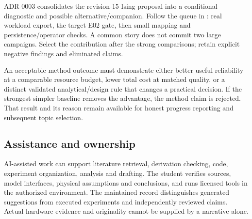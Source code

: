 ADR-0003 consolidates the revision-15 Ising proposal into a conditional diagnostic and
possible alternative/companion. Follow the queue in :
real workload export, the target E02 gate, then small mapping and persistence/operator
checks. A common story does not commit two large campaigns. Select the contribution
after the strong comparisons; retain explicit negative findings and eliminated claims.

An acceptable method outcome must demonstrate either better useful reliability at a
comparable resource budget, lower total cost at matched quality, or a distinct validated
analytical/design rule that changes a practical decision. If the strongest simpler
baseline removes the advantage, the method claim is rejected. That result and its
reason remain available for honest progress reporting and subsequent topic selection.

\subsection{Assistance and ownership}

AI-assisted work can support literature retrieval, derivation checking, code, experiment
organization, analysis and drafting. The student verifies sources, model interfaces,
physical assumptions and conclusions, and runs licensed tools in the authorized
environment. The maintained record distinguishes generated suggestions from executed
experiments and independently reviewed claims. Actual hardware evidence and originality
cannot be supplied by a narrative alone.
